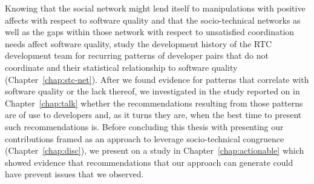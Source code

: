 Knowing that the social network might lend itself to manipulations with positive affects with respect to software quality and that the socio-technical networks as well as the gaps within those network with respect to unsatisfied coordination needs affect software quality, study the development history of the RTC development team for recurring patterns of developer pairs that do not coordinate and their statistical relationship to software quality (Chapter~\ref{chap:stc-net}).
After we found evidence for patterns that correlate with software quality or the lack thereof, we investigated in the study reported on in Chapter~\ref{chap:talk} whether the recommendations resulting from those patterns are of use to developers and, as it turns they are, when the best time to present such recommendations is.
Before concluding this thesis with presenting our contributions framed as an approach to leverage socio-technical congruence (Chapter~\ref{chap:disc}), we present on a study in Chapter~\ref{chap:actionable} which showed evidence that 
recommendations that our approach can generate could have prevent issues that we observed.






















